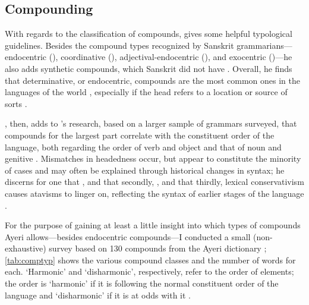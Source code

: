 \xe


\subsection{Compounding}

With regards to the classification of compounds, \citet{bauer2001} gives some 
helpful typological guidelines. Besides the compound types recognized by 
Sanskrit grammarians---endocentric (), coordinative 
(), adjectival-endo\-cent\-ric (), and 
exocentric ()---he also adds synthetic compounds, which Sanskrit 
did not have \citep[697]{bauer2001}. Overall, he finds that determinative, or 
endocentric, compounds are the most common ones in the languages of the world 
\citep[697]{bauer2001}, especially if the head refers to a location or source 
of sorts \citep[702]{bauer2001}.

\citet{gaeta2008}, then, adds to \citeauthor{bauer2001}'s research, based on a 
larger sample of grammars surveyed, that compounds for the largest part 
correlate with the constituent order of the language, both regarding the order 
of verb and object and that of noun and genitive \citep[129--133]{gaeta2008}. 
Mismatches in headedness occur, but appear to constitute the minority of cases 
and may often be explained through historical changes in syntax; he discerns  
for one that , and that secondly, , and that 
thirdly, lexical conservativism causes atavisms to linger on, reflecting the 
syntax of earlier stages of the language \citep[138--139]{gaeta2008}.

For the purpose of gaining at least a little insight into which types of 
compounds Ayeri allows---besides endocentric compounds---I conducted a small 
(non-exhaustive) survey based on 130 compounds from the Ayeri dictionary 
\citep[Dictionary]{benung}; \autoref{tab:comptyp} shows the various compound 
classes and the number of words for each. `Harmonic' and `disharmonic', 
respectively, refer to the order of elements; the order is `harmonic' 
if it is following the normal constituent order of the language and 
`disharmonic' if it is at odds with it \citep{gaeta2008}.

